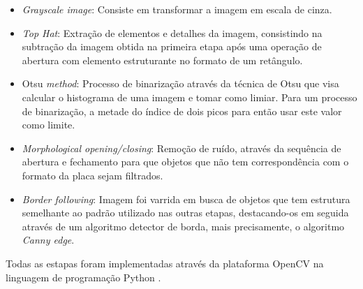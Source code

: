 
\begin{itemize}
    \item \emph{Grayscale image}: Consiste em transformar a imagem em escala de cinza. 
    \item \emph{Top Hat}: Extração de elementos e detalhes da imagem, consistindo na subtração da imagem obtida na primeira etapa após uma operação de abertura com elemento estruturante no formato de um retângulo.
    \item Otsu \emph{method}: Processo de binarização através da técnica de Otsu que visa calcular o histograma de uma imagem e tomar como limiar. Para um processo de binarização, a metade do índice de dois picos para então usar este valor como limite. 
    \item \emph{Morphological opening/closing}: Remoção de ruído, através da sequência de abertura e fechamento para que objetos que não tem correspondência com o formato da placa sejam filtrados. 
    \item \emph{Border following}: Imagem foi varrida em busca de objetos que tem estrutura semelhante ao padrão utilizado nas outras etapas, destacando-os em seguida através de um algoritmo detector de borda, mais precisamente, o algoritmo \emph{Canny edge}. 
\end{itemize}
    
Todas as estapas foram implementadas através da plataforma OpenCV na linguagem de programação Python \cite{Localisation} \cite{Gonzalez}.


